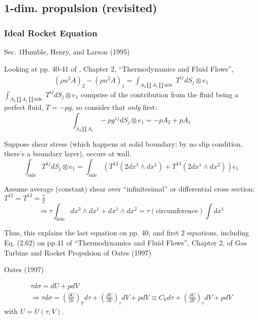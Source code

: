 \documentclass[10pt]{amsart}
\begin{document}
\begin{multicols*}{2}
\part{1-dim. propulsion (revisited)}

\section{Ideal Rocket Equation}

Sec. 1Humble, Henry, and Larson (1995)

Looking at pp. 40-41 of \cite{GOates1997}, Chapter 2, ``Thermodynamics and Fluid Flows'', 
\[
\begin{gathered}
  (\rho u^2 A)_2 - (\rho u^2 A)_1 = \int_{ A_2 \coprod A_1 \coprod \text{side }} T^{ij} dS_j \otimes e_1
\end{gathered}
\]
$\int_{ A_2 \coprod A_1 \coprod \text{side }} T^{ij} dS_j \otimes e_1$ comprise of the contribution from the fluid being a perfect fluid, $T=-pg$, so consider that \emph{only} first:
\[
\int_{A_2 \coprod A_1} - p g^{1j} dS_j\otimes e_1 = -pA_2 + pA_1
\]


Suppose shear stress (which happens at solid boundary; by no slip condition, there's a boundary layer), occurs at wall.  
\[
\int_{\text{side}}T^{1j}dS_j \otimes e_1 = \int_{\text{side}} (T^{12} (2dx^3 \wedge dx^1) + T^{13} (2dx^1 \wedge dx^2 ) ) e_1
\]

Assume average (constant) shear over ``infinitesimal'' or differential cross section: $T^{12}=T^{13} = \frac{\tau}{2}$
\[
\Longrightarrow \tau \int_{\text{side}} dx^3 \wedge dx^1 + dx^1 \wedge dx^2 = \tau (\text{circumference}) \int dx^1
\]

Thus, this explains the last equation on pp. 40, and first 2 equations, including Eq. (2.62) on pp.41 of ``Thermodynamics and Fluid Flows'', Chapter 2, of  Gas Turbine and Rocket Propulsion of Oates (1997) \cite{GOates1997}



Oates (1997) \cite{GOates1997}

\[
\begin{gathered}
  \tau d\sigma = dU + pdV \\
  \Longrightarrow \tau d\sigma = \left( \frac{ \partial U}{ \partial \tau} \right)_V d\tau  + \left( \frac{ \partial U}{ \partial V} \right)_{\tau} dV + p dV \equiv C_V d\tau + \left( \frac{ \partial U}{ \partial V} \right)_{\tau} dV + pdV
\end{gathered}
\]
with $U = U(\tau,V)$.  


\end{multicols*}
\end{document}
